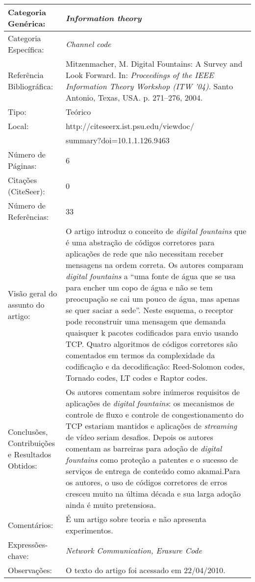 \documentclass[10pt,a4paper]{article}
\begin{document}
\begin{center}
\begin{tabular}{|p{5cm}||p{10cm}|}
\hline

Categoria Genérica: & \emph{Information theory}\\\hline
Categoria Específica: & \emph{Channel code}\\\hline
Referência Bibliográfica: & Mitzenmacher, M. Digital Fountains: A Survey and Look Forward. In:  \emph{Proceedings of the IEEE Information Theory Workshop (ITW '04)}. Santo Antonio, Texas, USA. p. 271--276, 2004.\\\hline
Tipo: & Teórico\\\hline
Local: & http://citeseerx.ist.psu.edu/viewdoc/\\ &summary?doi=10.1.1.126.9463\\\hline
Número de Páginas: & 6\\\hline
Citações (CiteSeer): & 0\\\hline
Número de Referências: & 33\\\hline
Visão geral do assunto do artigo: & O artigo introduz o conceito de \emph{digital fountains} que é uma abstração de códigos corretores para aplicações de rede que não necessitam receber mensagens na ordem correta. Os autores comparam \emph{digital fountains} a ``uma fonte de água que se usa para encher um copo de água e não se tem preocupação se cai um pouco de água, mas apenas se quer saciar a sede''. Neste esquema, o receptor pode reconstruir uma mensagem que demanda quaisquer k pacotes codificados para envio usando TCP. Quatro algoritmos de códigos corretores são comentados em termos da complexidade da codificação e da decodificação: Reed-Solomon codes, Tornado codes, LT codes e Raptor codes.  \\\hline
Conclusões, Contribuições e Resultados Obtidos: & Os autores comentam sobre inúmeros requisitos de aplicações de \emph{digital fountains}: os mecanismos de controle de fluxo e controle de congestionamento do TCP estariam mantidos e aplicações de \emph{streaming} de vídeo seriam desafios. Depois os autores comentam as barreiras para adoção de \emph{digital fountains} como proteção a patentes e o sucesso de serviços de entrega de conteúdo como akamai.Para os autores, o uso de códigos corretores de erros cresceu muito na última década e sua larga adoção ainda é muito pretensiosa.\\\hline
Comentários: & É um artigo sobre teoria e não apresenta experimentos. \\\hline
Expressões-chave: & \emph{Network Communication, Erasure Code}\\\hline
Observações: &  O texto do artigo foi acessado em 22/04/2010.\\\hline

\end{tabular}
\end{center}
\end{document}
